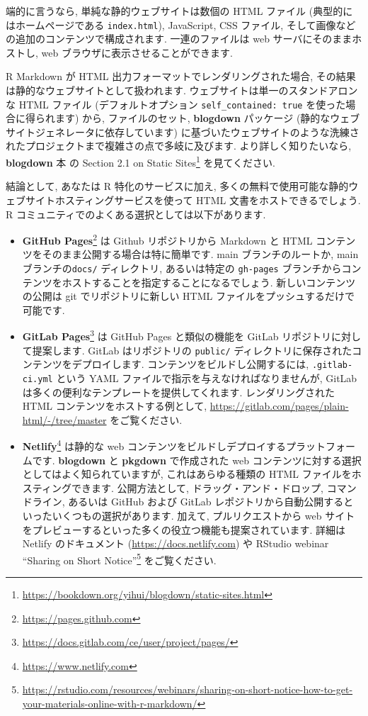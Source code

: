 \documentclass[
  11pt,
  lualatex,ja=standard,jafont=noto]{bxjsreport}
\renewcommand{\href}[2]{#2\footnote{\url{#1}}}
\begin{document}
端的に言うなら, 単純な静的ウェブサイトは数個の HTML ファイル (典型的にはホームページである \texttt{index.html}), JavaScript, CSS ファイル, そして画像などの追加のコンテンツで構成されます. 一連のファイルは web サーバにそのままホストし, web ブラウザに表示させることができます.

R Markdown が HTML 出力フォーマットでレンダリングされた場合, その結果は静的なウェブサイトとして扱われます. ウェブサイトは単一のスタンドアロンな HTML ファイル (デフォルトオプション \texttt{self\_contained: true} を使った場合に得られます) から, ファイルのセット, \textbf{blogdown} パッケージ (静的なウェブサイトジェネレータに依存しています) に基づいたウェブサイトのような洗練されたプロジェクトまで複雑さの点で多岐に及びます. より詳しく知りたいなら, \textbf{blogdown} 本 \autocite{blogdown2017} の \href{https://bookdown.org/yihui/blogdown/static-sites.html}{Section 2.1 on Static Sites} を見てください.

結論として, あなたは R 特化のサービスに加え, 多くの無料で使用可能な静的ウェブサイトホスティングサービスを使って HTML 文書をホストできるでしょう. R コミュニティでのよくある選択としては以下があります.

\begin{itemize}
\item
  \href{https://pages.github.com}{\textbf{GitHub Pages}} は Github リポジトリから Markdown と HTML コンテンツをそのまま公開する場合は特に簡単です. main ブランチのルートか, main ブランチの\texttt{docs/} ディレクトリ, あるいは特定の \texttt{gh-pages} ブランチからコンテンツをホストすることを指定することになるでしょう. 新しいコンテンツの公開は git でリポジトリに新しい HTML ファイルをプッシュするだけで可能です.
\item
  \href{https://docs.gitlab.com/ce/user/project/pages/}{\textbf{GitLab Pages}} は GitHub Pages と類似の機能を GitLab リポジトリに対して提案します. GitLab はリポジトリの \texttt{public/} ディレクトリに保存されたコンテンツをデプロイします. コンテンツをビルドし公開するには, \texttt{.gitlab-ci.yml} という YAML ファイルで指示を与えなければなりませんが, GitLab は多くの便利なテンプレートを提供してくれます. レンダリングされた HTML コンテンツをホストする例として, \url{https://gitlab.com/pages/plain-html/-/tree/master} をご覧ください.
\item
  \href{https://www.netlify.com}{\textbf{Netlify}} は静的な web コンテンツをビルドしデプロイするプラットフォームです. \textbf{blogdown} と \textbf{pkgdown} で作成された web コンテンツに対する選択としてはよく知られていますが, これはあらゆる種類の HTML ファイルをホスティングできます. 公開方法として, ドラッグ・アンド・ドロップ, コマンドライン, あるいは GitHub および GitLab レポジトリから自動公開するといったいくつもの選択があります. 加えて, プルリクエストから web サイトをプレビューするといった多くの役立つ機能も提案されています. 詳細は Netlify のドキュメント (\url{https://docs.netlify.com}) や RStudio webinar \href{https://rstudio.com/resources/webinars/sharing-on-short-notice-how-to-get-your-materials-online-with-r-markdown/}{``Sharing on Short Notice''} をご覧ください.
\end{itemize}
\end{document}
